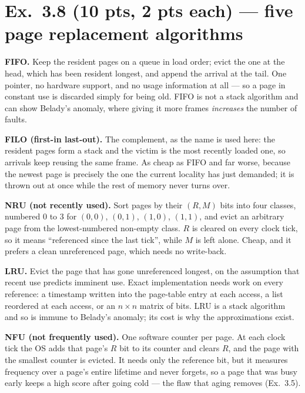 \section*{Ex.\ 3.8 \quad (10 pts, 2 pts each) --- five page replacement algorithms}

\textbf{FIFO.} Keep the resident pages on a queue in load order; evict the one at the
head, which has been resident longest, and append the arrival at the tail. One pointer,
no hardware support, and no usage information at all --- so a page in constant use is
discarded simply for being old. FIFO is not a stack algorithm and can show Belady's
anomaly, where giving it more frames \emph{increases} the number of faults.

\textbf{FILO (first-in last-out).} The complement, as the name is used here: the
resident pages form a stack and the victim is the most recently loaded one, so arrivals
keep reusing the same frame. As cheap as FIFO and far worse, because the newest page is
precisely the one the current locality has just demanded; it is thrown out at once while
the rest of memory never turns over.

\textbf{NRU (not recently used).} Sort pages by their $(R,M)$ bits into four classes,
numbered 0 to 3 for $(0,0)$, $(0,1)$, $(1,0)$, $(1,1)$, and evict an arbitrary page
from the lowest-numbered non-empty class. $R$ is cleared on every clock tick, so it
means ``referenced since the last tick'', while $M$ is left alone. Cheap, and it
prefers a clean unreferenced page, which needs no write-back.

\textbf{LRU.} Evict the page that has gone unreferenced longest, on the assumption that
recent use predicts imminent use. Exact implementation needs work on every reference: a
timestamp written into the page-table entry at each access, a list reordered at each
access, or an $n \times n$ matrix of bits. LRU is a stack algorithm and so is immune to
Belady's anomaly; its cost is why the approximations exist.

\textbf{NFU (not frequently used).} One software counter per page. At each clock tick
the OS adds that page's $R$ bit to its counter and clears $R$, and the page with the
smallest counter is evicted. It needs only the reference bit, but it measures frequency
over a page's entire lifetime and never forgets, so a page that was busy early keeps a
high score after going cold --- the flaw that aging removes (Ex.\ 3.5).
